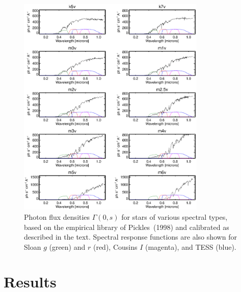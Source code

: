 \documentclass[preprint,10pt]{aastex}
\begin{document}
\begin{figure}
\begin{center}
\includegraphics[width=0.8\textwidth]{pickles2.eps}
\end{center}
\caption{Photon flux densities $\Gamma(0,s)$ for stars of various
spectral types, based on the empirical library of Pickles~(1998) and
calibrated as described in the text. Spectral response functions are also shown
for Sloan $g$ (green) and $r$ (red), Cousins $I$ (magenta), 
and TESS (blue).}
\label{fig:pickles2}
\end{figure}

\section{Results}
\end{document}

